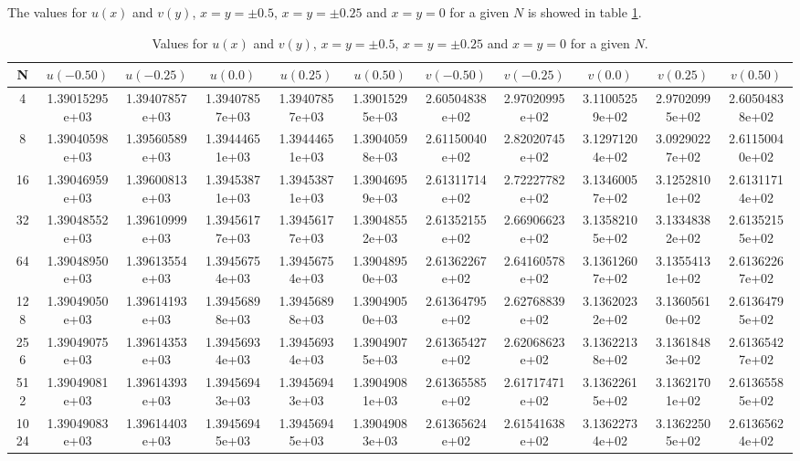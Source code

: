 The values for \( u\left( x \right)  \) and  \( v\left( y \right)  \), \( x=y= \pm0.5  \), \( x=y= \pm0.25  \) and \( x=y= 0  \)  for a given \( N \) is showed in table \ref{tb:resultater}.

\begin{table}[th!]
\centering
\begin{tabular}{c|c|c|c|c|c|c|c|c|c|c}
 N &  \( u(-0.50) \) & \( u(-0.25) \) & \( u(0.0) \) & \( u(0.25) \) & \( u(0.50) \) & \( v(-0.50) \) & \( v(-0.25) \) & \( v(0.0) \) & \( v(0.25) \) & \( v(0.50) \)  \\\hline
4&1.39015295e+03&1.39407857e+03&1.39407857e+03&1.39407857e+03&1.39015295e+03&2.60504838e+02&2.97020995e+02&3.11005259e+02&2.97020995e+02&2.60504838e+02\\
8&1.39040598e+03&1.39560589e+03&1.39444651e+03&1.39444651e+03&1.39040598e+03&2.61150040e+02&2.82020745e+02&3.12971204e+02&3.09290227e+02&2.61150040e+02
\\
16&1.39046959e+03&1.39600813e+03&1.39453871e+03&1.39453871e+03&1.39046959e+03&2.61311714e+02&2.72227782e+02&3.13460057e+02&3.12528101e+02&2.61311714e+02\\
32&1.39048552e+03&1.39610999e+03&1.39456177e+03&1.39456177e+03&1.39048552e+03&2.61352155e+02&2.66906623e+02&3.13582105e+02&3.13348382e+02&2.61352155e+02\\
64&1.39048950e+03&1.39613554e+03&1.39456754e+03&1.39456754e+03&1.39048950e+03&2.61362267e+02&2.64160578e+02&3.13612607e+02&3.13554131e+02&2.61362267e+02
 \\
128&1.39049050e+03&1.39614193e+03&1.39456898e+03&1.39456898e+03&1.39049050e+03&2.61364795e+02&2.62768839e+02&3.13620232e+02&3.13605610e+02&2.61364795e+02 \\ 
256&1.39049075e+03&1.39614353e+03&1.39456934e+03&1.39456934e+03&1.39049075e+03&2.61365427e+02&2.62068623e+02&3.13622138e+02&3.13618483e+02&2.61365427e+02\\
512&1.39049081e+03&1.39614393e+03&1.39456943e+03&1.39456943e+03&1.39049081e+03&2.61365585e+02&2.61717471e+02&3.13622615e+02&3.13621701e+02&2.61365585e+02 \\
1024&1.39049083e+03&1.39614403e+03&1.39456945e+03&1.39456945e+03&1.39049083e+03&2.61365624e+02&2.61541638e+02&3.13622734e+02&3.13622505e+02&2.61365624e+02 \\
\end{tabular}
\caption[tekst i indholdsfortegnelsen]{Values for \( u\left( x \right)  \) and  \( v\left( y \right)  \), \( x=y= \pm0.5  \), \( x=y= \pm0.25  \) and \( x=y= 0  \)  for a given \( N \).}
\label{tb:resultater}
\end{table}

